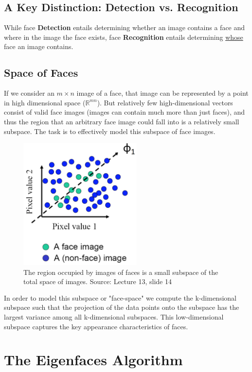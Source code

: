 \documentclass{article}
\begin{document}
\subsection{A Key Distinction: Detection vs. Recognition}
While face \textbf{Detection} entails determining whether an image contains a face and where in the image the face exists, face \textbf{Recognition} entails determining \underline{whose} face an image contains.

\subsection{Space of Faces}
If we consider an $m \times n$ image of a face, that image can be represented by a point in high dimensional space (${\mathbb{R}}^{mn}$). But relatively few high-dimensional vectors consist of valid face images (images can contain much more than just faces), and thus the region that an arbitrary face image could fall into is a relatively small subspace. The task is to effectively model this subspace of face images.

\begin{figure}[h]
  \centering
  \includegraphics[width=0.55\textwidth]{face_non-face_plot}
  \caption{The region occupied by images of faces is a small subspace of the total space of images. Source: Lecture 13, slide 14}
\end{figure}

In order to model this subspace or "face-space" we compute the k-dimensional subspace such that the projection of the data points onto the subspace has the largest variance among all k-dimensional subspaces. This low-dimensional subspace captures the key appearance characteristics of faces. 

\section{The Eigenfaces Algorithm}
\end{document}
